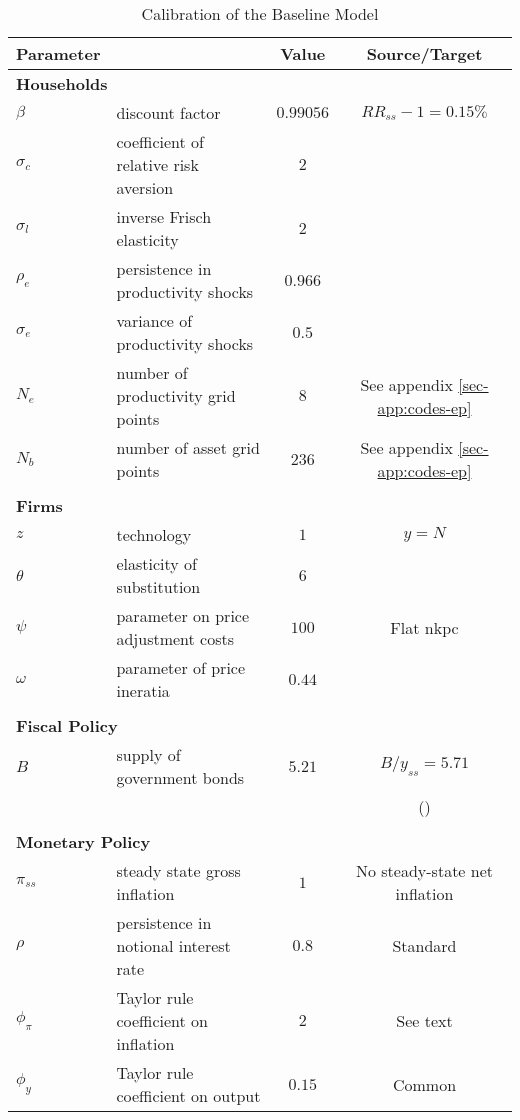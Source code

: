 \documentclass[a4paper,12pt]{article} %
\numberwithin{equation}{section} %
\numberwithin{figure}{section}
\numberwithin{table}{section}
\begin{document}
\begin{table}[t]
\centering
\caption{Calibration of the Baseline Model}
\label{tab:calibration-baseline}
\begin{tabular}{llcc}
Parameter &   &  Value & Source/Target \\
\hline
\hline
\multicolumn{2}{l}{\textbf{Households}} & & \\
$\beta$ &  discount factor & $0.99056$ & $RR_{ss}-1 = 0.15\%$ \\
$\sigma_c$ & coefficient of relative risk aversion & $2$ & \textcite{auclert2021} \\
$\sigma_l$ & inverse Frisch elasticity & $2$ & \textcite{auclert2021} \\
$\rho_e$ & persistence in productivity shocks & $0.966$ & \textcite{auclert2021} \\
$\sigma_e$ & variance of productivity shocks & $0.5$ & \textcite{auclert2021} \\
$N_e$ & number of productivity grid points & $8$ & See appendix \ref{sec-app:codes-ep} \\
$N_b$ & number of asset grid points & $236$ & See appendix \ref{sec-app:codes-ep} \\
& & & \\
\multicolumn{2}{l}{\textbf{Firms}} & & \\
$z$ &  technology & $1$ & $y=N$ \\
$\theta$ & elasticity of substitution & $6$ & \textcite{auclert2021} \\
$\psi$ & parameter on price adjustment costs & $100$ & Flat \Gls{nkpc} \\
$\omega$ & parameter of price ineratia & $0.44$ & \textcite{gust2017wp} \\
& & & \\
\multicolumn{2}{l}{\textbf{Fiscal Policy}} & & \\
$B$ & supply of government bonds & $5.21$ & $B/y_{ss} = 5.71$ \\
& & & (\cite{mckay2016}) \\
& & & \\
\multicolumn{2}{l}{\textbf{Monetary Policy}} & & \\
$\pi_{ss}$ & steady state gross inflation & $1$ & No steady-state net inflation \\
$\rho$ & persistence in notional interest rate & $0.8$ & Standard \\
$\phi_{\pi}$ & Taylor rule coefficient on inflation & $2$ & See text \\
$\phi_{y}$ & Taylor rule coefficient on output & $0.15$ & Common \\

\end{tabular}
\end{table}
\end{document}
